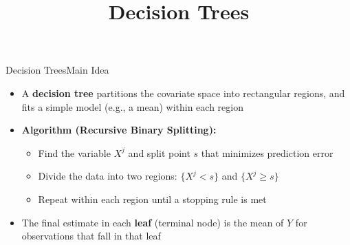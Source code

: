 \documentclass[dvipsnames,hyperref={pdfpagelabels=false}]{beamer}
\begin{document}
\title[]
{Decision Trees}

\author{}
\institute{}
\date{}

\begin{frame}{}
	\titlepage
\end{frame}




\begin{frame}{Decision Trees}{Main Idea}
	\begin{itemize}
		\item A \textbf{decision tree} partitions the covariate space into rectangular regions, and fits a simple model (e.g., a mean) within each region
		\vspace{0.3cm}
		\item \textbf{Algorithm (Recursive Binary Splitting):}
		\vspace{0.2cm}
		\begin{itemize}
			\item[1] Find the variable $X^j$ and split point $s$ that minimizes prediction error
			\vspace{0.2cm}
			\item[2] Divide the data into two regions: $\{X^j < s\}$ and $\{X^j \geq s\}$
			\vspace{0.2cm}
			\item[3] Repeat within each region until a stopping rule is met
		\end{itemize}
		\vspace{0.3cm}
		\item The final estimate in each \textbf{leaf} (terminal node) is the mean of $Y$ for observations that fall in that leaf
	\end{itemize}
\end{frame}
\end{document}
